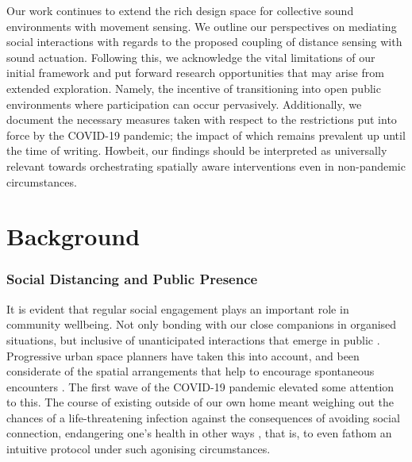 Our work continues to extend the rich design space for collective sound environments with movement sensing. We outline our perspectives on mediating social interactions with regards to the proposed coupling of distance sensing with sound actuation. Following this, we acknowledge the vital limitations of our initial framework and put forward research opportunities that may arise from extended exploration. Namely, the incentive of transitioning into open public environments where participation can occur pervasively. Additionally, we document the necessary measures taken with respect to the restrictions put into force by the COVID-19 pandemic; the impact of which remains prevalent up until the time of writing. Howbeit, our findings should be interpreted as universally relevant towards orchestrating spatially aware interventions even in non-pandemic circumstances. 
\section{Background}
\label{sec2:Background}

\subsubsection{Social Distancing and Public Presence}
\label{subsec:public_space}

It is evident that regular social engagement plays an important role in community wellbeing. Not only bonding with our close companions in organised situations, but inclusive of unanticipated interactions that emerge in public \citep{ang_your_2021,simoes_aelbrecht_rethinking_2010,sugiyama_associations_2008}. Progressive urban space planners have taken this into account, and been considerate of the spatial arrangements that help to encourage spontaneous encounters \citep{latham_social_2019,okkels_urban_2018,mehta_look_2009}. The first wave of the COVID-19 pandemic elevated some attention to this. The course of existing outside of our own home meant weighing out the chances of a life-threatening infection against the consequences of avoiding social connection, endangering one's health in other ways \citep{brooks_psychological_2020,rivera_effects_2020,zorzo_adult_2019,evans_social_2019}, that is, to even fathom an intuitive protocol under such agonising circumstances.

